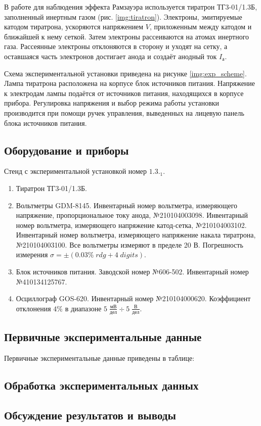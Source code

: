 \documentclass[10pt,a4paper]{article}
\begin{document}
	В работе для наблюдения эффекта Рамзауэра используется тиратрон ТГ3-01/1.3Б, заполненный инертным газом (рис. \ref{img:tiratron}). Электроны, эмитируемые катодом тиратрона, ускоряются напряжением $V$, приложенным между катодом и ближайшей к нему сеткой. Затем электроны рассеиваются на атомах инертного газа. Рассеянные электроны отклоняются в сторону и уходят на сетку, а оставшаяся часть электронов достигает анода и создаёт анодный ток $I_а$.
	
	Схема экспериментальной установки приведена на рисунке \ref{img:exp_scheme}. Лампа тиратрона расположена на корпусе блок источников питания. Напряжение к электродам лампы подаётся от источников питания, находящихся в корпусе прибора. Регулировка напряжения и выбор режима работы установки производится при помощи ручек управления, выведенных на лицевую панель блока источников питания.	
	
	\subsection*{Оборудование и приборы}
		
	Стенд с экспериментальной установкой номер $1.3._1$.
	\begin{enumerate}
		\item Тиратрон ТГ3-01/1.3Б.
				
		\item Вольтметры GDM-8145. Инвентарный номер вольтметра, измеряющего напряжение, пропорциональное току анода, №210104003098. Инвентарный номер вольтметра, измеряющего напряжение катод-сетка, №210104003102. Инвентарный номер вольтметра, измеряющего напряжение накала тиратрона, №210104003100. Все вольтметры измеряют в пределе 20 В. Погрешность измерения $\sigma = \pm (0.03\% \; rdg + 4 \; digits)$.
		
		\item Блок источников питания. Заводской номер №606-502. Инвентарный номер №410134125767.
		
		\item Осциллограф GOS-620. Инвентарный номер №210104000620. Коэффициент отклонения $4\%$ в диапазоне $5 \; \frac{мВ}{дел} \div 5 \; \frac{В}{дел}$.
	\end{enumerate}
	
	\subsection*{Первичные экспериментальные данные}
	
	Первичные экспериментальные данные приведены в таблице:\\
	\begin{center}
	\end{center}

	
	
	\subsection*{Обработка экспериментальных данных}
	
	
	\subsection*{Обсуждение результатов и выводы}
	
	
\end{document}
